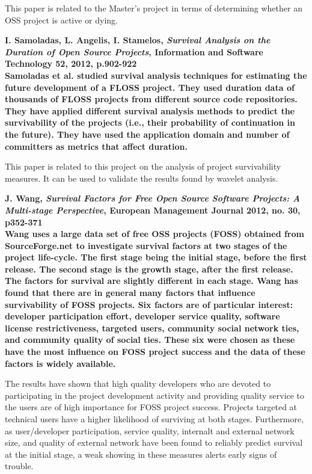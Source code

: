 \begin{thebibliography}{99}
		This paper is related to the Master's project in terms of determining whether
		an OSS project is active or dying.

	 \bfseries{I. Samoladas, L. Angelis, I. Stamelos,
		\emph{Survival Analysis on the Duration of Open Source Projects}, Information
		and Software Technology 52, 2012, p.902-922}\rm
		\\

		Samoladas et al. studied survival analysis techniques for estimating the
		future development of a FLOSS project. They used duration data of thousands of
		FLOSS projects from different source code repositories. They have applied
		different survival analysis methods to predict the survivability of the
		projects (i.e., their probability of continuation in the future). They have
		used the application domain and number of committers as metrics that affect
		duration.

		This paper is related to this project on the analysis of project survivability
		measures. It can be used to validate the results found by wavelet analysis.
	
	 \bfseries{J. Wang, \emph{Survival Factors for Free Open
		Source Software Projects: A Multi-stage Perspective}, European Management
		Journal 2012, no. 30, p352-371}\rm
		\\

		Wang uses a large data set of free OSS projects (FOSS) obtained from
		SourceForge.net to investigate survival factors at two stages of the project
		life-cycle. The first stage being the initial stage, before the first release.
		The second stage is the growth stage, after the first release. The factors for
		survival are slightly different in each stage. Wang has found that there are
		in general many factors that influence survivability of FOSS projects. Six
		factors are of particular interest: developer participation effort, developer
		service quality, software license restrictiveness, targeted users, community
		social network ties, and community quality of social ties. These six were
		chosen as these have the most influence on FOSS project success and the data
		of these factors is widely available.
		
		The results have shown that high quality developers who are devoted to
		participating in the project development activity and providing quality
		service to the users are of high importance for FOSS project success. Projects
		targeted at technical users have a higher likelihood of surviving at both
		stages. Furthermore, as user/developer participation, service quality,
		internalt and external network size, and quality of external network have been
		found to reliably predict survival at the initial stage, a weak showing in
		these measures alerts early signs of trouble.

\end{thebibliography}
